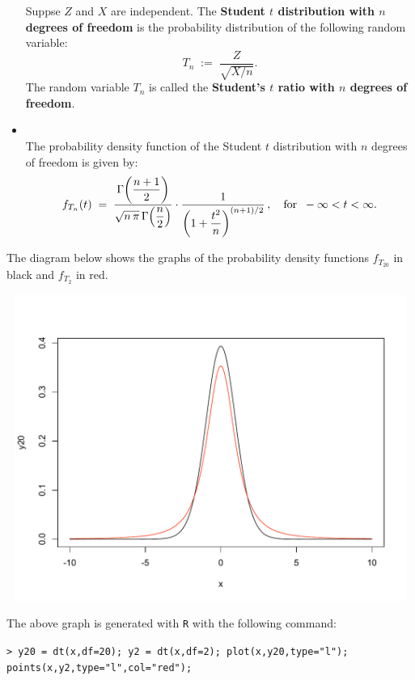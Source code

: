 \documentclass{article}
\begin{document}
\begin{itemize}
\begin{definition}
          Suppse $Z$ and $X$ are independent.
          The \textbf{Student $t$ distribution with $n$ degrees of freedom} is the probability distribution of the following
          random variable:
          \begin{equation*}
          T_{n} \; := \; \dfrac{Z}{\sqrt{X/n}}.
          \end{equation*}
          The random variable $T_{n}$ is called the \textbf{Student's $t$ ratio with $n$ degrees of freedom}.
          \end{definition}
\item  \begin{theorem}\mbox{}\\
          The probability density function of the Student $t$ distribution with $n$ degrees of freedom is given by:
          \begin{equation*}
          f_{T_{n}}(t) \; = \; \dfrac{\Gamma\!\left(\dfrac{n+1}{2}\right)}{\sqrt{n\,\pi}\,\Gamma\!\left(\dfrac{n}{2}\right)}
                                      \cdot
                                      \dfrac{1}{\left(1+\dfrac{t^{2}}{n}\right)^{(n+1)/2}}\,,
          \quad\textnormal{for}\;\; -\infty < t < \infty.
          \end{equation*}
          \end{theorem}
\end{itemize}

The diagram below shows the graphs of the probability density functions $f_{T_{20}}$ in black and $f_{T_{2}}$ in red.
\begin{center}
\includegraphics[height=10cm,width=14cm]{StudentTDist-df20-df2.pdf}
\end{center}
The above graph is generated with \texttt{R} with the following command:
\begin{center}
\texttt{> y20 = dt(x,df=20); y2 = dt(x,df=2); plot(x,y20,type="l"); points(x,y2,type="l",col="red");}
\end{center}
\end{document}
